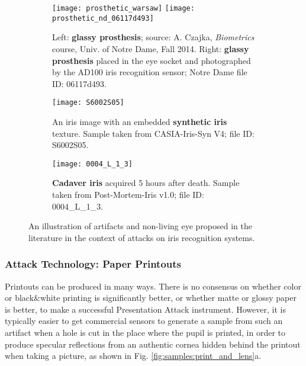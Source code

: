 \documentclass[format=acmsmall, review=false, timestamp=false]{acmart}
\begin{document}
\begin{figure*}[!htb]
    \centering
    \begin{subfigure}[t]{0.485\textwidth}
        \texttt{[image: prosthetic\_warsaw]}\hskip3mm
        \texttt{[image: prosthetic\_nd\_06117d493]}
        \caption{Left: {\bf glassy prosthesis}; source: A. Czajka, {\it Biometrics} course, Univ. of Notre Dame, Fall 2014. Right: {\bf glassy prosthesis} placed in the eye socket and photographed by the AD100 iris recognition sensor; Notre Dame file ID: 06117d493.}
    \end{subfigure}\hfill
    \begin{subfigure}[t]{0.235\textwidth}
        \texttt{[image: S6002S05]}
        \caption{An iris image with an embedded {\bf synthetic iris} texture. Sample taken from  {\sf CASIA-Iris-Syn V4}; file ID: S6002S05.}
    \end{subfigure}\hfill
    \begin{subfigure}[t]{0.235\textwidth}
        \texttt{[image: 0004\_L\_1\_3]}
        \caption{{\bf Cadaver iris} acquired 5 hours after death. Sample taken from  {\sf Post-Mortem-Iris v1.0}; file ID: 0004\_L\_1\_3.}
    \end{subfigure}\hfill
    \caption{An illustration of artifacts and non-living eye proposed in the literature in the context of attacks on iris recognition systems.}
    \label{fig:samples:other}
\end{figure*}



\subsubsection{Attack Technology: Paper Printouts}

Printouts can be produced in many ways. There is no consensus on whether  color or black\&white printing is significantly better, or whether matte or glossy paper is better, to make a successful {Presentation Attack} instrument. However, it is typically easier to get commercial sensors to generate a sample from such {an} artifact when a hole is cut in the place where the pupil is printed, in order to produce specular reflections from an authentic cornea hidden behind the printout when taking a picture, as shown in Fig. \ref{fig:samples:print_and_lens}a.
\end{document}
